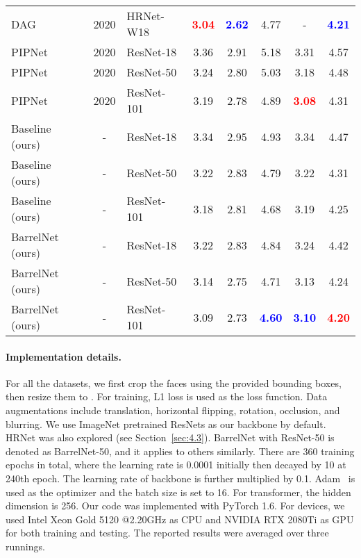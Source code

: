 \documentclass{article}
\begin{document}
\begin{table}
\begin{tabularx}{\textwidth}{lClCCCCC}
DAG~\citep{LLZ20} & 2020 & HRNet-W18 & \textcolor{red}{\textbf{3.04}} & \textcolor{blue}{\textbf{2.62}} & 4.77 & - & \textcolor{blue}{\textbf{4.21}} \\ 
PIPNet~\citep{JLS20} & 2020    & ResNet-18  & 3.36   & 2.91   & 5.18   & 3.31 & 4.57 \\ 
PIPNet & 2020    & ResNet-50  & 3.24   & 2.80   & 5.03   & 3.18 & 4.48 \\
PIPNet & 2020    & ResNet-101  & 3.19   & 2.78   & 4.89   & \textcolor{red}{\textbf{3.08}} & 4.31 \\ 
\midrule
Baseline (ours) & -    & ResNet-18  & 3.34   & 2.95   & 4.93   & 3.34 & 4.47 \\ 
Baseline (ours) & -    & ResNet-50  & 3.22   & 2.83   & 4.79   & 3.22 & 4.31 \\
Baseline (ours) & -    & ResNet-101  & 3.18   & 2.81   & 4.68   & 3.19 & 4.25 \\ 
\midrule
BarrelNet (ours) & -    & ResNet-18  & 3.22   & 2.83   & 4.84   & 3.24 & 4.42 \\ 
BarrelNet (ours) & -    & ResNet-50  & 3.14   & 2.75   & 4.71   & 3.13 & 4.24 \\
BarrelNet (ours) & -    & ResNet-101  & 3.09   & 2.73   & \textcolor{blue}{\textbf{4.60}}   & \textcolor{blue}{\textbf{3.10}} & \textcolor{red}{\textbf{4.20}} \\
\bottomrule
\end{tabularx}
\label{tab:results}
\end{table}

\paragraph{Implementation details.}
For all the datasets, we first crop the faces using the provided bounding boxes, then resize them to . For training, L1 loss is used as the loss function. Data augmentations include translation, horizontal flipping, rotation, occlusion, and blurring. We use ImageNet pretrained ResNets as our backbone by default. HRNet was also explored (see Section~\ref{sec:4.3}). BarrelNet with ResNet-50 is denoted as BarrelNet-50, and it applies to others similarly. There are 360 training epochs in total, where the learning rate is 0.0001 initially then decayed by 10 at 240th epoch. The learning rate of backbone is further multiplied by 0.1. Adam~\citep{KiB15} is used as the optimizer and the batch size is set to 16. For transformer, the hidden dimension  is 256. Our code was implemented with PyTorch 1.6. For devices, we used Intel Xeon Gold 5120 @2.20GHz as CPU and NVIDIA RTX 2080Ti as GPU for both training and testing. The reported results were averaged over three runnings.
\end{document}
